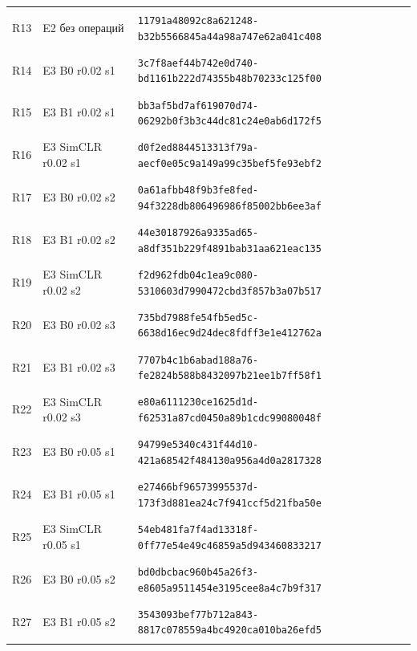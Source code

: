 \begin{longtable}{@{}l>{\raggedright\arraybackslash}p{3.5cm}p{10.8cm}@{}}
\hypertarget{R13}{R13} & E2 без операций & {\fontsize{8.8}{11}\selectfont\texttt{11791a48092c8a621248-b32b5566845a44a98a747e62a041c408}} \\
\hypertarget{R14}{R14} & E3 B0 r0.02 s1 & {\fontsize{8.8}{11}\selectfont\texttt{3c7f8aef44b742e0d740-bd1161b222d74355b48b70233c125f00}} \\
\hypertarget{R15}{R15} & E3 B1 r0.02 s1 & {\fontsize{8.8}{11}\selectfont\texttt{bb3af5bd7af619070d74-06292b0f3b3c44dc81c24e0ab6d172f5}} \\
\hypertarget{R16}{R16} & E3 SimCLR r0.02 s1 & {\fontsize{8.8}{11}\selectfont\texttt{d0f2ed8844513313f79a-aecf0e05c9a149a99c35bef5fe93ebf2}} \\
\hypertarget{R17}{R17} & E3 B0 r0.02 s2 & {\fontsize{8.8}{11}\selectfont\texttt{0a61afbb48f9b3fe8fed-94f3228db806496986f85002bb6ee3af}} \\
\hypertarget{R18}{R18} & E3 B1 r0.02 s2 & {\fontsize{8.8}{11}\selectfont\texttt{44e30187926a9335ad65-a8df351b229f4891bab31aa621eac135}} \\
\hypertarget{R19}{R19} & E3 SimCLR r0.02 s2 & {\fontsize{8.8}{11}\selectfont\texttt{f2d962fdb04c1ea9c080-5310603d7990472cbd3f857b3a07b517}} \\
\hypertarget{R20}{R20} & E3 B0 r0.02 s3 & {\fontsize{8.8}{11}\selectfont\texttt{735bd7988fe54fb5ed5c-6638d16ec9d24dec8fdff3e1e412762a}} \\
\hypertarget{R21}{R21} & E3 B1 r0.02 s3 & {\fontsize{8.8}{11}\selectfont\texttt{7707b4c1b6abad188a76-fe2824b588b8432097b21ee1b7ff58f1}} \\
\hypertarget{R22}{R22} & E3 SimCLR r0.02 s3 & {\fontsize{8.8}{11}\selectfont\texttt{e80a6111230ce1625d1d-f62531a87cd0450a89b1cdc99080048f}} \\
\hypertarget{R23}{R23} & E3 B0 r0.05 s1 & {\fontsize{8.8}{11}\selectfont\texttt{94799e5340c431f44d10-421a68542f484130a956a4d0a2817328}} \\
\hypertarget{R24}{R24} & E3 B1 r0.05 s1 & {\fontsize{8.8}{11}\selectfont\texttt{e27466bf96573995537d-173f3d881ea24c7f941ccf5d21fba50e}} \\
\hypertarget{R25}{R25} & E3 SimCLR r0.05 s1 & {\fontsize{8.8}{11}\selectfont\texttt{54eb481fa7f4ad13318f-0ff77e54e49c46859a5d943460833217}} \\
\hypertarget{R26}{R26} & E3 B0 r0.05 s2 & {\fontsize{8.8}{11}\selectfont\texttt{bd0dbcbac960b45a26f3-e8605a9511454e3195cee8a4c7b9f317}} \\
\hypertarget{R27}{R27} & E3 B1 r0.05 s2 & {\fontsize{8.8}{11}\selectfont\texttt{3543093bef77b712a843-8817c078559a4bc4920ca010ba26efd5}} \\

\end{longtable}
